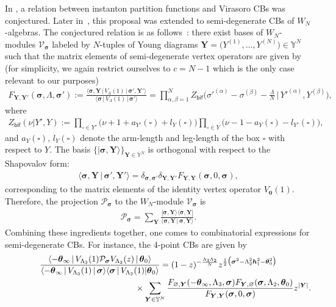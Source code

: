 \documentclass[pdftex]{sigma}
\newcommand{\bs}{\boldsymbol}
\newcommand{\la}{\langle} \newcommand{\ra}{\rangle}
\numberwithin{equation}{section}
\begin{document}
In \cite{AGT}, a relation between instanton partition functions and Virasoro CBs was conjectured. Later in~\cite{Wyl}, this proposal was extended to semi-degenerate CBs of $W_N$-algebras. The conjectured relation is as follows~\cite{FL3}: there exist bases of $W_N$-modules $\mathcal{V}_{\bs \sigma}$ labeled by $N$-tuples of Young diagrams $\bs Y=\big(Y^{(1)},\ldots,Y^{(N)}\big)\in\mathbb Y^N$ such that the matrix elements of semi-degenerate vertex operators are given by (for simplicity, we again restrict ourselves to $c=N-1$ which is the only case relevant to our purposes)
\begin{gather}\label{GTF}
F_{\bs Y,\bs Y'}(\bs\sigma,\Lambda,\bs\sigma'):=
\frac{ \la \bs\sigma, \bs Y\,|\,V_\Lambda(1)\,|\,\bs\sigma', \bs Y' \ra}
{ \la \bs\sigma\,|\,V_\Lambda(1)\,|\,\bs\sigma' \ra}=\prod_{\alpha,\beta=1}^N Z_{\mathsf{bif}}
\big({\sigma'}^{(\alpha)}- \sigma^{(\beta)} -\tfrac{\Lambda}{N}\,\big|\, {Y'}^{(\alpha)},Y^{(\beta)}\big),\!\!\!
\end{gather}
where
\begin{gather}\label{Zbif}
Z_{\mathsf{bif}}(\nu|Y',Y):=\prod_{\square\in Y'}\bigl(\nu+1+a_{Y'}(\square)+l_{Y}(\square)\bigr)
\prod_{\square\in Y}\bigl(\nu-1-a_{Y}(\square)-l_{Y'}(\square)\bigr),
\end{gather}
and $a_{Y}(\square)$, $l_{Y}(\square)$ denote the arm-length and leg-length of the box $\square$ with respect to $Y$. The basis $\{|\bs\sigma, \bs Y\ra\}_{\bs Y\in\mathbb Y^N}$ is orthogonal with respect to the Shapovalov form:
\begin{gather*}
 \la \bs\sigma, \bs Y\,|\,\bs\sigma', \bs Y' \ra= \delta_{\bs\sigma,\bs\sigma'} \delta_{\bs Y,\bs Y'}F_{\bs Y,\bs Y}(\bs\sigma,0,\bs\sigma),
\end{gather*}
corresponding to the matrix elements of the identity vertex operator $V_{\bs 0}(1)$. Therefore, the projection $\mathcal{P}_{\bs \sigma}$ to the $W_N$-module $\mathcal{V}_{\bs \sigma}$ is
\begin{gather*}
\mathcal{P}_{\bs \sigma}=\sum_{\bs Y}\frac{|\bs\sigma, \bs Y\ra \la \bs\sigma, \bs Y|}{\la \bs\sigma, \bs Y\,|\,\bs\sigma, \bs Y\ra}.
\end{gather*}
Combining these ingredients together, one comes to combinatorial expressions for semi-degene\-ra\-te CBs. For instance, the 4-point CBs are given by
\begin{gather*}
\frac{\la -\bs\theta_\infty\,|\,V_{\Lambda_3}(1)\mathcal{P}_{\bs\sigma} V_{\Lambda_2}(z)\,|\,\bs\theta_0 \ra}
{\la -\bs\theta_\infty\,|\,V_{\Lambda_3}(1) \,|\,{\bs\sigma} \ra \la{\bs\sigma}\,|\,V_{\Lambda_2}(1)|\bs\theta_0 \ra}
 = (1-z)^{-\frac{\Lambda_3 \Lambda_2}{N}} z^{\frac12\big(\bs\sigma^2-\Lambda_2^2 \bs h_1^2-\bs\theta_0^2\big)}
\nonumber \\
\hphantom{\frac{\la -\bs\theta_\infty\,|\,V_{\Lambda_3}(1)\mathcal{P}_{\bs\sigma} V_{\Lambda_2}(z)\,|\,\bs\theta_0 \ra}
{\la -\bs\theta_\infty\,|\,V_{\Lambda_3}(1) \,|\,{\bs\sigma} \ra \la{\bs\sigma}\,|\,V_{\Lambda_2}(1)|\bs\theta_0 \ra}=}{} \times\sum_{\bs Y\in\mathbb Y^N}
\frac {F_{\bs\varnothing, \bs Y}(-\bs\theta_\infty,\Lambda_3,\bs\sigma) F_{ \bs Y, \bs \varnothing}(\bs\sigma,\Lambda_2,\bs \theta_0)}{F_{\bs Y, \bs Y}(\bs\sigma,0,\bs\sigma)} z^{|\bs Y|}.
\end{gather*}
\end{document}
